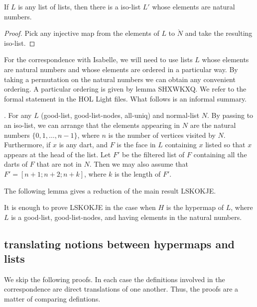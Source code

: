 \begin{lemma}
If $L$ is any list of lists, then there is a iso-list $L'$ whose elements are natural numbers.
\end{lemma}

\begin{proof} Pick any injective map from the elements of $L$ to $\ring{N}$ and take the resulting iso-list.
\end{proof}

For the correspondence with Isabelle, we will need to use lists $L$ whose elements are natural numbers and
whose elements are ordered in a particular way.  By taking a permutation on the natural numbers we can obtain
any convenient ordering.  A particular ordering is given by lemma SHXWKXQ.  We refer to the formal statement
in the HOL Light files.  What follows is an informal summary.

\begin{lemma}.  For any $L$ (good-list, good-list-nodes, all-uniq)
and normal-list $N$.  By passing to an iso-list, we can arrange that the elements appearing
in $N$ are the natural numbers $\{0,1,\ldots,n-1\}$, where $n$ is the number of vertices visited by $N$.
Furthermore, if $x$ is any dart, and $F$ is the face in $L$ containing $x$ listed so that $x$ appears at the head of the
list.  Let $F'$ be the filtered list of $F$ containing all the darts of $F$ that are not in $N$.  Then we may also assume that
$F' = [n+1;n+2;n+k]$, where $k$ is the length of $F'$.
\end{lemma}

The following lemma gives a reduction of the main result LSKOKJE.

\begin{lemma}[JCAJYDU]
 It is enough to prove LSKOKJE in the case when $H$ is the hypermap of $L$,
where $L$ is a good-list, good-list-nodes, and having elements in the natural numbers.
\end{lemma}


\subsection{translating notions between hypermaps and lists}


We skip the following proofs.  In each case the definitions involved in the correspondence
are direct translations of one another.  Thus, the proofs are a matter of comparing defintions.

